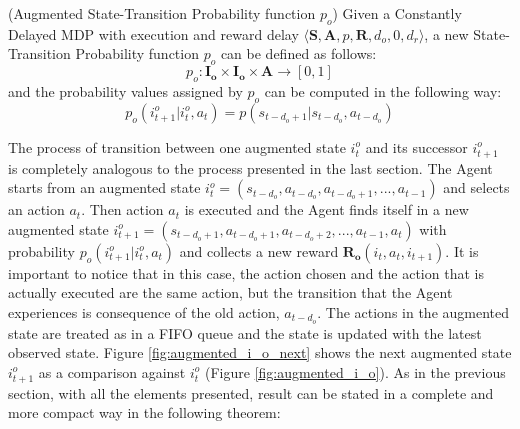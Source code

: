                 \begin{definition}(Augmented State-Transition Probability function $p_o$)
                    \label{def:obsaugmenttrans}
                    Given a Constantly Delayed MDP with execution and reward delay $\langle \mathbf{S}, \mathbf{A}, p, \mathbf{R}, d_o, 0, d_r \rangle$,
                    a new State-Transition Probability function $p_o$ can be defined as follows:
                    \[ p_o :  \mathbf{I_{o}} \times \mathbf{I_{o}} \times \mathbf{A} \rightarrow [0, 1]\]
                    and the probability values assigned by $p_o$ can be computed in the following way:
                    \[ p_o \left( i_{t+1}^o | i_t^o , a_t  \right) = p ( s_{t-d_{o}+1} | s_{t-d_{o}}, a_{t-d_{o}} ) \]
                \end{definition}                
                
                The process of transition between one augmented state $i^o_t$ and its successor $i^o_{t+1}$ is completely analogous to the process presented in the last section. The Agent starts from an augmented state $i^o_t = \left( s_{t-d_{o}}, a_{t-d_{o}}, a_{t-d_{o}+1}, ...,  a_{t-1}\right)$ and selects an action $a_t$. Then action $a_t$ is executed and the Agent finds itself in a new augmented state $i^o_{t+1} = \left( s_{t-d_{o}+1}, a_{t-d_{o}+1}, a_{t-d_{o}+2}, ...,  a_{t-1}, a_{t}\right)$ with probability $p_o \left( i_{t+1}^o | i_t^o , a_t  \right)$ and collects a new reward $\mathbf{R_{o}}\left( i_t, a_{t}, i_{t+1} \right)$. It is important to notice that in this case, the action chosen and the action that is actually executed are the same action, but the transition that the Agent experiences is consequence of the old action, $a_{t-d_{o}}$. The actions in the augmented state are treated as in a FIFO queue and the state is updated with the latest observed state. Figure \ref{fig:augmented_i_o_next} shows the next augmented state $i^o_{t+1}$ as a comparison against $i^o_t$ (Figure \ref{fig:augmented_i_o}).
                As in the previous section, with all the elements presented,  result can be stated in a complete and more compact way in the following theorem:
                
